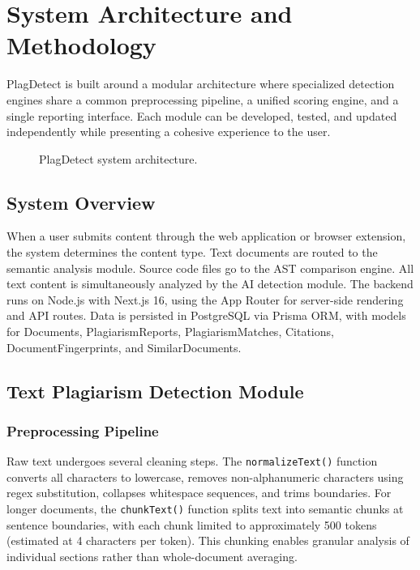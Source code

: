 \documentclass[10pt,twocolumn]{article}
\begin{document}
\section{System Architecture and Methodology}

PlagDetect is built around a modular architecture where specialized detection engines share a common preprocessing pipeline, a unified scoring engine, and a single reporting interface. Each module can be developed, tested, and updated independently while presenting a cohesive experience to the user.

\begin{figure}[htbp]
\centering
\vspace{4cm}
\caption{PlagDetect system architecture.}
\label{fig:arch}
\end{figure}

\subsection{System Overview}

When a user submits content through the web application or browser extension, the system determines the content type. Text documents are routed to the semantic analysis module. Source code files go to the AST comparison engine. All text content is simultaneously analyzed by the AI detection module. The backend runs on Node.js with Next.js 16, using the App Router for server-side rendering and API routes. Data is persisted in PostgreSQL via Prisma ORM, with models for Documents, PlagiarismReports, PlagiarismMatches, Citations, DocumentFingerprints, and SimilarDocuments.

\subsection{Text Plagiarism Detection Module}

\subsubsection{Preprocessing Pipeline}
Raw text undergoes several cleaning steps. The \texttt{normalizeText()} function converts all characters to lowercase, removes non-alphanumeric characters using regex substitution, collapses whitespace sequences, and trims boundaries. For longer documents, the \texttt{chunkText()} function splits text into semantic chunks at sentence boundaries, with each chunk limited to approximately 500 tokens (estimated at 4 characters per token). This chunking enables granular analysis of individual sections rather than whole-document averaging.
\end{document}

